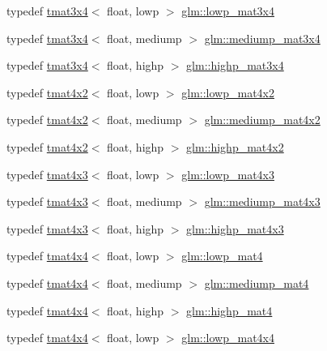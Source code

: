 \begin{DoxyCompactItemize}
typedef \hyperlink{structglm_1_1tmat3x4}{tmat3x4}$<$ float, lowp $>$ \hyperlink{group__core__precision_ga06b2903b2f784e0e74e58f25e9b79b15}{glm\+::lowp\+\_\+mat3x4}
\item 
typedef \hyperlink{structglm_1_1tmat3x4}{tmat3x4}$<$ float, mediump $>$ \hyperlink{group__core__precision_ga0ea90a4a20efa6c104c7ad21144ccefe}{glm\+::mediump\+\_\+mat3x4}
\item 
typedef \hyperlink{structglm_1_1tmat3x4}{tmat3x4}$<$ float, highp $>$ \hyperlink{group__core__precision_gab51b3b8377cf9462a39a1560333a4215}{glm\+::highp\+\_\+mat3x4}
\item 
typedef \hyperlink{structglm_1_1tmat4x2}{tmat4x2}$<$ float, lowp $>$ \hyperlink{group__core__precision_gaae545974fa5b7fcb9574ea67f8922c50}{glm\+::lowp\+\_\+mat4x2}
\item 
typedef \hyperlink{structglm_1_1tmat4x2}{tmat4x2}$<$ float, mediump $>$ \hyperlink{group__core__precision_gaa8a2840660d106dca70acf525e8bfa6c}{glm\+::mediump\+\_\+mat4x2}
\item 
typedef \hyperlink{structglm_1_1tmat4x2}{tmat4x2}$<$ float, highp $>$ \hyperlink{group__core__precision_ga289d5d6b112dc6e3f545e7f98d3d0b5c}{glm\+::highp\+\_\+mat4x2}
\item 
typedef \hyperlink{structglm_1_1tmat4x3}{tmat4x3}$<$ float, lowp $>$ \hyperlink{group__core__precision_ga4649624907ac00347237476ead4178e1}{glm\+::lowp\+\_\+mat4x3}
\item 
typedef \hyperlink{structglm_1_1tmat4x3}{tmat4x3}$<$ float, mediump $>$ \hyperlink{group__core__precision_ga98bbda89d371b41b3d56bcbc7a4d868d}{glm\+::mediump\+\_\+mat4x3}
\item 
typedef \hyperlink{structglm_1_1tmat4x3}{tmat4x3}$<$ float, highp $>$ \hyperlink{group__core__precision_ga549b3b126dfbf5f9fef6b76deb15cb4e}{glm\+::highp\+\_\+mat4x3}
\item 
typedef \hyperlink{structglm_1_1tmat4x4}{tmat4x4}$<$ float, lowp $>$ \hyperlink{group__core__precision_ga070380d2efa0c37d16f8677412518e02}{glm\+::lowp\+\_\+mat4}
\item 
typedef \hyperlink{structglm_1_1tmat4x4}{tmat4x4}$<$ float, mediump $>$ \hyperlink{group__core__precision_ga2bd55bee1eaded7673421b1ae24175d5}{glm\+::mediump\+\_\+mat4}
\item 
typedef \hyperlink{structglm_1_1tmat4x4}{tmat4x4}$<$ float, highp $>$ \hyperlink{group__core__precision_ga26f802a535816c7357df06361e695172}{glm\+::highp\+\_\+mat4}
\item 
typedef \hyperlink{structglm_1_1tmat4x4}{tmat4x4}$<$ float, lowp $>$ \hyperlink{group__core__precision_ga83e14edb4422871bdc644f4209b5f9ff}{glm\+::lowp\+\_\+mat4x4}

\end{DoxyCompactItemize}
